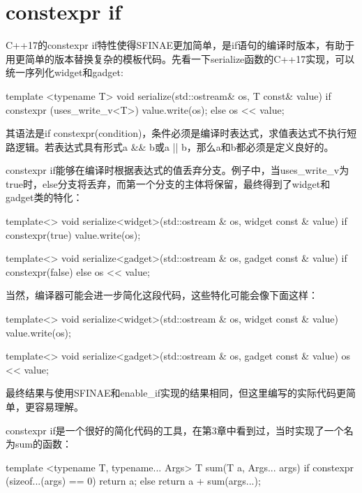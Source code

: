\section{constexpr if}
C++17的constexpr if特性使得SFINAE更加简单，是if语句的编译时版本，有助于用更简单的版本替换复杂的模板代码。先看一下serialize函数的C++17实现，可以统一序列化widget和gadget:

\begin{cpp}
template <typename T>
void serialize(std::ostream& os, T const& value)
{
	if constexpr (uses_write_v<T>)
		value.write(os);
	else
		os << value;
}
\end{cpp}

其语法是if constexpr(condition)，条件必须是编译时表达式，求值表达式不执行短路逻辑。若表达式具有形式a \&\& b或a || b，那么a和b都必须是定义良好的。

constexpr if能够在编译时根据表达式的值丢弃分支。例子中，当uses\_write\_v为true时，else分支将丢弃，而第一个分支的主体将保留，最终得到了widget和gadget类的特化：

\begin{cpp}
template<>
void serialize<widget>(std::ostream & os,
                      widget const & value)
{
	if constexpr(true)
	{
		value.write(os);
	}
}

template<>
void serialize<gadget>(std::ostream & os,
                      gadget const & value)
{
	if constexpr(false)
	{
	}
	else
	{
		os << value;
	}
}
\end{cpp}

当然，编译器可能会进一步简化这段代码，这些特化可能会像下面这样：

\begin{cpp}
template<>
void serialize<widget>(std::ostream & os,
                       widget const & value)
{
	value.write(os);
}

template<>
void serialize<gadget>(std::ostream & os,
					   gadget const & value)
{
	os << value;
}
\end{cpp}

最终结果与使用SFINAE和enable\_if实现的结果相同，但这里编写的实际代码更简单，更容易理解。

constexpr if是一个很好的简化代码的工具，在第3章中看到过，当时实现了一个名为sum的函数：

\begin{cpp}
template <typename T, typename... Args>
T sum(T a, Args... args)
{
	if constexpr (sizeof...(args) == 0)
		return a;
	else
		return a + sum(args...);
}
\end{cpp}

